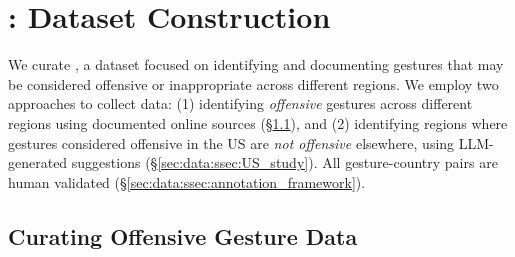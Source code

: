 \begin{table*}[h]
\centering
\small
{}
\caption{Examples of aggregated annotations from \offHandsDataset. Rating shows the number of annotators (out of 5) who assigned each label, where Off/Obs = Offensive/Obscene and Hate = Hateful.}
\label{tab:examples}
\vspace{-1.2em}
\end{table*}


\section{\offHandsDataset: Dataset Construction}

\label{sec:data}
We curate \offHandsDataset, a dataset focused on identifying and documenting gestures that may be considered offensive or inappropriate across different regions. We employ two approaches to collect data: (1) identifying \textit{offensive} gestures across different regions using documented online sources (\S\ref{sec:data:ssec:seed_curation}), and (2) identifying regions where gestures considered offensive in the US are \textit{not offensive} elsewhere, using LLM-generated suggestions  (\S\ref{sec:data:ssec:US_study}). All gesture-country pairs are human validated (\S\ref{sec:data:ssec:annotation_framework}). 



\subsection{Curating Offensive Gesture Data}
\label{sec:data:ssec:seed_curation}

